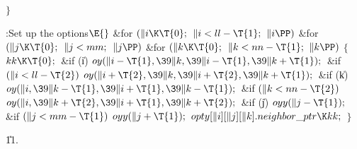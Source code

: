 \4${}\}{}$\2\par
\Y\B\4:Set up the  options\X${}\E{}$\6
\&{for} ${}(\|i\K\T{0};{}$ ${}\|i<\\{ll}-\T{1};{}$ ${}\|i\PP){}$\1\6
\&{for} ${}(\|j\K\T{0};{}$ ${}\|j<\\{mm};{}$ ${}\|j\PP){}$\1\6
\&{for} ${}(\|k\K\T{0};{}$ ${}\|k<\\{nn}-\T{1};{}$ ${}\|k\PP){}$\5
${}\{{}$\1\6
${}\\{kk}\K\T{0};{}$\6
\&{if} (\|i)\1\5
${}\\{oy}(\|i-\T{1},\39\|k,\39\|i-\T{1},\39\|k+\T{1});{}$\2\6
\&{if} ${}(\|i<\\{ll}-\T{2}){}$\1\5
${}\\{oy}(\|i+\T{2},\39\|k,\39\|i+\T{2},\39\|k+\T{1});{}$\2\6
\&{if} (\|k)\1\5
${}\\{oy}(\|i,\39\|k-\T{1},\39\|i+\T{1},\39\|k-\T{1});{}$\2\6
\&{if} ${}(\|k<\\{nn}-\T{2}){}$\1\5
${}\\{oy}(\|i,\39\|k+\T{2},\39\|i+\T{1},\39\|k+\T{2});{}$\2\6
\&{if} (\|j)\1\5
${}\\{oyy}(\|j-\T{1});{}$\2\6
\&{if} ${}(\|j<\\{mm}-\T{1}){}$\1\5
${}\\{oyy}(\|j+\T{1});{}$\2\6
${}\\{opty}[\|i][\|j][\|k].\\{neighbor\_ptr}\K\\{kk};{}$\6
\4${}\}{}$\2\2\2\par
\U11.\fi

